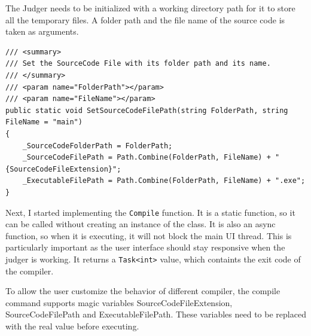 \documentclass[a4paper]{report}
\newcommand{\code}{\texttt}
\begin{document}
The Judger needs to be initialized with a working directory path for it to store all the temporary files. A folder path and the file name of the source code is taken as arguments.

\begin{verbatim}
/// <summary>
/// Set the SourceCode File with its folder path and its name.
/// </summary>
/// <param name="FolderPath"></param>
/// <param name="FileName"></param>
public static void SetSourceCodeFilePath(string FolderPath, string FileName = "main")
{
    _SourceCodeFolderPath = FolderPath;
    _SourceCodeFilePath = Path.Combine(FolderPath, FileName) + "{SourceCodeFileExtension}";
    _ExecutableFilePath = Path.Combine(FolderPath, FileName) + ".exe";
}
\end{verbatim}

Next, I started implementing the \code{Compile} function. It is a static function, so it can be called without creating an instance of the class. It is also an async function, so when it is executing, it will not block the main UI thread. This is particularly important as the user interface should stay responsive when the judger is working. It returns a \code{Task<int>} value, which containts the exit code of the compiler.

To allow the user customize the behavior of different compiler, the compile command supports magic variables SourceCodeFileExtension, SourceCodeFilePath and ExecutableFilePath. These variables need to be replaced with the real value before executing.
\end{document}
